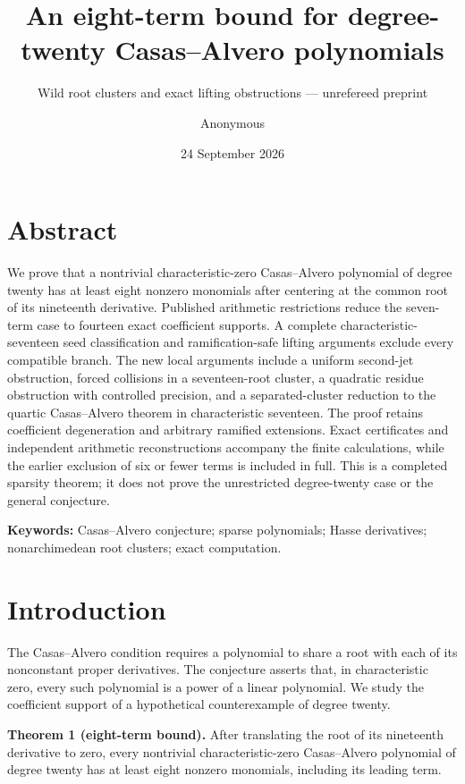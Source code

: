\documentclass[
  british,
  10pt,
  a4paper,
]{article}
\title{An eight-term bound for degree-twenty Casas--Alvero polynomials}
\subtitle{Wild root clusters and exact lifting obstructions ---
unrefereed preprint}
\author{Anonymous}
\date{24 September 2026}
\begin{document}
\maketitle

{
\setcounter{tocdepth}{3}
\tableofcontents
}
\section*{Abstract}\label{abstract}

We prove that a nontrivial characteristic-zero Casas--Alvero polynomial
of degree twenty has at least eight nonzero monomials after centering at
the common root of its nineteenth derivative. Published arithmetic
restrictions reduce the seven-term case to fourteen exact coefficient
supports. A complete characteristic-seventeen seed classification and
ramification-safe lifting arguments exclude every compatible branch. The
new local arguments include a uniform second-jet obstruction, forced
collisions in a seventeen-root cluster, a quadratic residue obstruction
with controlled precision, and a separated-cluster reduction to the
quartic Casas--Alvero theorem in characteristic seventeen. The proof
retains coefficient degeneration and arbitrary ramified extensions.
Exact certificates and independent arithmetic reconstructions accompany
the finite calculations, while the earlier exclusion of six or fewer
terms is included in full. This is a completed sparsity theorem; it does
not prove the unrestricted degree-twenty case or the general conjecture.

\textbf{Keywords:} Casas--Alvero conjecture; sparse polynomials; Hasse
derivatives; nonarchimedean root clusters; exact computation.

\section{Introduction}\label{introduction}

The Casas--Alvero condition requires a polynomial to share a root with
each of its nonconstant proper derivatives. The conjecture asserts that,
in characteristic zero, every such polynomial is a power of a linear
polynomial. We study the coefficient support of a hypothetical
counterexample of degree twenty.

\textbf{Theorem 1 (eight-term bound).} After translating the root of its
nineteenth derivative to zero, every nontrivial characteristic-zero
Casas--Alvero polynomial of degree twenty has at least eight nonzero
monomials, including its leading term.
\end{document}
